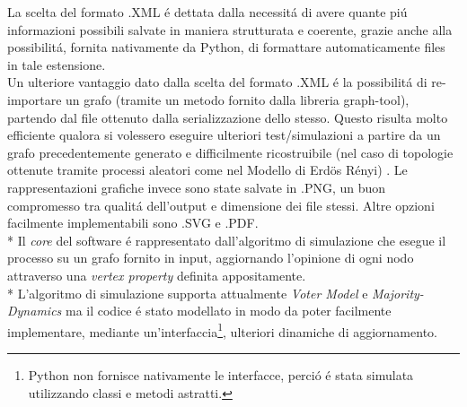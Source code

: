 \documentclass[../Tesi.tex]{subfiles}
\begin{document}
La scelta del formato .XML \'e dettata dalla necessit\'a di avere quante pi\'u informazioni possibili salvate in maniera strutturata e coerente, grazie anche alla possibilit\'a, fornita nativamente da Python, di formattare automaticamente files in tale estensione.\\
Un ulteriore vantaggio dato dalla scelta del formato .XML \'e la possibilit\'a di re-importare un grafo (tramite un metodo fornito dalla libreria graph-tool), partendo dal file ottenuto dalla serializzazione dello stesso. Questo risulta molto efficiente qualora si volessero eseguire ulteriori test/simulazioni a partire da un grafo precedentemente generato e difficilmente ricostruibile (nel caso di topologie ottenute tramite processi aleatori come nel Modello di Erd{\"o}s R\'enyi) \cite{Erdos:1959:pmd}.
Le rappresentazioni grafiche invece sono state salvate in .PNG, un buon compromesso tra qualit\'a dell'output e dimensione dei file stessi. Altre opzioni facilmente implementabili sono .SVG e .PDF.\\*
Il \emph{core} del software \'e rappresentato dall'algoritmo di simulazione che esegue il processo su un grafo fornito in input, aggiornando l'opinione di ogni nodo attraverso una \emph{vertex property} definita appositamente.\\*
L'algoritmo di simulazione supporta attualmente \emph{Voter Model} e \emph{Majority-Dynamics} ma il codice \'e stato modellato in modo da poter facilmente implementare, mediante un'interfaccia\footnote{Python non fornisce nativamente le interfacce, perci\'o \'e stata simulata utilizzando classi e metodi astratti.}, ulteriori dinamiche di aggiornamento.
\end{document}
